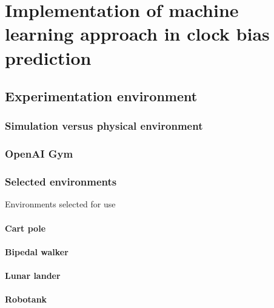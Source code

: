 \FloatBarrier
\chapter{Implementation of machine learning approach in clock bias prediction}


\FloatBarrier
\section{Experimentation environment}

\FloatBarrier
\subsection{Simulation versus physical environment}

\FloatBarrier
\subsection{OpenAI Gym}

\FloatBarrier
\subsection{Selected environments}
Environments selected for use 

\FloatBarrier
\subsubsection{Cart pole}
\FloatBarrier
\subsubsection{Bipedal walker}
\FloatBarrier
\subsubsection{Lunar lander}
\FloatBarrier
\subsubsection{Robotank}

\FloatBarrier
